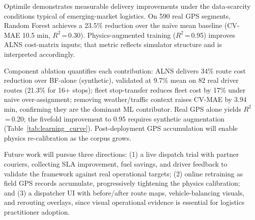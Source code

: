 \documentclass[conference]{IEEEtran}
\begin{document}
Optimile demonstrates measurable delivery improvements under the data-scarcity
conditions typical of emerging-market logistics. On 590 real GPS segments,
Random Forest achieves a 23.5\% reduction over the na\"{i}ve mean baseline
(CV-MAE 10.5 min, $R^2$\,=\,0.30). Physics-augmented training ($R^2$\,=\,0.95)
improves ALNS cost-matrix inputs; that metric reflects simulator structure and
is interpreted accordingly.

Component ablation quantifies each contribution: ALNS delivers 34\% route
cost reduction over BF-alone (synthetic), validated at 9.7\% mean on 82 real
driver routes (21.3\% for 16+ stops); fleet stop-transfer reduces fleet cost
by 17\% under naive over-assignment; removing weather/traffic context raises
CV-MAE by 3.94 min, confirming they are the dominant ML contributor.
Real GPS alone yields $R^2$\,=\,0.20; the fivefold improvement to 0.95
requires synthetic augmentation (Table~\ref{tab:learning_curve}). Post-deployment
GPS accumulation will enable physics re-calibration as the corpus grows.

Future work will pursue three directions: (1) a live dispatch trial with
partner couriers, collecting SLA improvement, fuel savings, and driver
feedback to validate the framework against real operational targets; (2) online
retraining as field GPS records accumulate, progressively tightening the
physics calibration; and (3) a dispatcher UI with before/after route maps,
vehicle-balancing visuals, and rerouting overlays, since visual operational
evidence is essential for logistics practitioner adoption.



\end{document}
